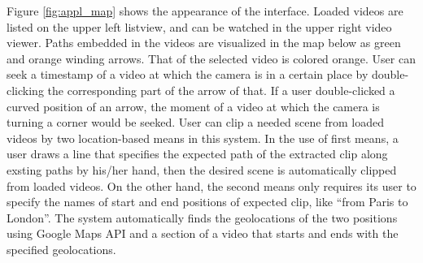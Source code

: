 Figure \ref{fig:appl_map} shows the appearance of the interface.
Loaded videos are listed on the upper left listview, and can be watched in the upper right video viewer.
Paths embedded in the videos are visualized in the map below as green and orange winding arrows. That of the selected video is colored orange.
User can seek a timestamp of a video at which the camera is in a certain place by double-clicking the corresponding part of the arrow of that.
If a user double-clicked a curved position of an arrow, the moment of a video at which the camera is turning a corner would be seeked.
User can clip a needed scene from loaded videos by two location-based means in this system.
In the use of first means, a user draws a line that specifies the expected path of the extracted clip along exsting paths by his/her hand, then the desired scene is automatically clipped from loaded videos.
On the other hand, the second means only requires its user to specify the names of start and end positions of expected clip, like ``from Paris to London''.
The system automatically finds the geolocations of the two positions using Google Maps API \cite{googlemapsapi} and a section of a video that starts and ends with the specified geolocations.

